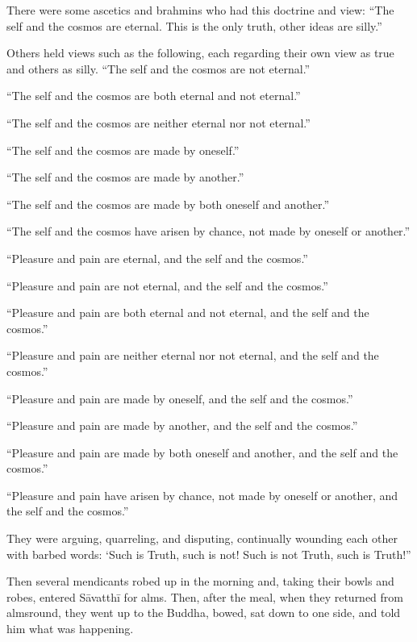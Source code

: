 \documentclass[12pt,openany]{book}%
\begin{document}
There were some ascetics and brahmins who had this doctrine and view: “The self and the cosmos are eternal. This is the only truth, other ideas are silly.” 

Others held views such as the following, each regarding their own view as true and others as silly. “The self and the cosmos are not eternal.” 

“The self and the cosmos are both eternal and not eternal.” 

“The self and the cosmos are neither eternal nor not eternal.” 

“The self and the cosmos are made by oneself.” 

“The self and the cosmos are made by another.” 

“The self and the cosmos are made by both oneself and another.” 

“The self and the cosmos have arisen by chance, not made by oneself or another.” 

“Pleasure and pain are eternal, and the self and the cosmos.” 

“Pleasure and pain are not eternal, and the self and the cosmos.” 

“Pleasure and pain are both eternal and not eternal, and the self and the cosmos.” 

“Pleasure and pain are neither eternal nor not eternal, and the self and the cosmos.” 

“Pleasure and pain are made by oneself, and the self and the cosmos.” 

“Pleasure and pain are made by another, and the self and the cosmos.” 

“Pleasure and pain are made by both oneself and another, and the self and the cosmos.” 

“Pleasure and pain have arisen by chance, not made by oneself or another, and the self and the cosmos.” 

They were arguing, quarreling, and disputing, continually wounding each other with barbed words: ‘Such is Truth, such is not! Such is not Truth, such is Truth!” 

Then several mendicants robed up in the morning and, taking their bowls and robes, entered \textsanskrit{Sāvatthī} for alms. Then, after the meal, when they returned from almsround, they went up to the Buddha, bowed, sat down to one side, and told him what was happening. 
\end{document}
